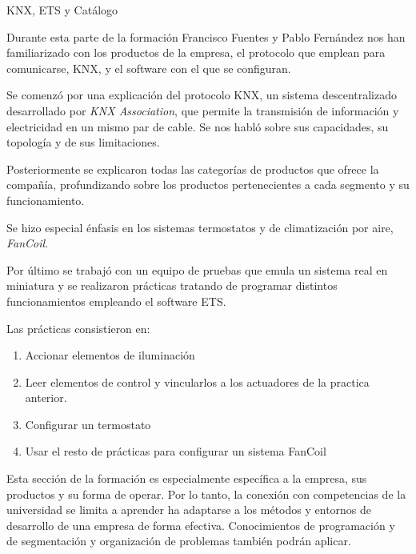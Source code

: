 \ReportSection
{KNX, ETS y Catálogo}{}
{
    Durante esta parte de la formación Francisco Fuentes y Pablo Fernández nos han familiarizado con los productos de la empresa, el protocolo que emplean para comunicarse, KNX, y el software con el que se configuran.
    
    Se comenzó por una explicación del protocolo KNX, un sistema descentralizado desarrollado por \emph{KNX Association}, que permite la transmisión de información y electricidad en un mismo par de cable. Se nos habló sobre sus capacidades, su topología y de sus limitaciones.
    
    Posteriormente se explicaron todas las categorías de productos que ofrece la compañía, profundizando sobre los productos pertenecientes a cada segmento y su funcionamiento.
    
    Se hizo especial énfasis en los sistemas termostatos y de climatización por aire, \emph{FanCoil}.
    
    Por último se trabajó con un equipo de pruebas que emula un sistema real en miniatura y se realizaron prácticas tratando de programar distintos funcionamientos empleando el software ETS.
    
    Las prácticas consistieron en:
    \begin{enumerate}
        \item Accionar elementos de iluminación
        \item Leer elementos de control y vincularlos a los actuadores de la practica anterior.
        \item Configurar un termostato
        \item Usar el resto de prácticas para configurar un sistema FanCoil
    \end{enumerate}
    
}
{
    Esta sección de la formación es especialmente específica a la empresa, sus productos y su forma de operar. Por lo tanto, la conexión con competencias de la universidad se limita a aprender ha adaptarse a los métodos y entornos de desarrollo de una empresa de forma efectiva. Conocimientos de programación y de segmentación y organización de problemas también podrán aplicar.
}

